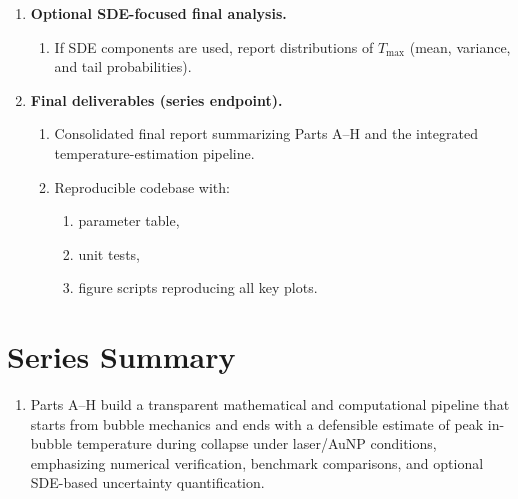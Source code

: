 \documentclass[11pt]{article}
\begin{document}
\begin{enumerate}
		\item \textbf{Optional SDE-focused final analysis.}
		\begin{enumerate}
			\item If SDE components are used, report distributions of $T_{\max}$ (mean, variance, and tail probabilities).
		\end{enumerate}
		
		\item \textbf{Final deliverables (series endpoint).}
		\begin{enumerate}
			\item Consolidated final report summarizing Parts A--H and the integrated temperature-estimation pipeline.
			\item Reproducible codebase with:
			\begin{enumerate}
				\item parameter table,
				\item unit tests,
				\item figure scripts reproducing all key plots.
			\end{enumerate}
		\end{enumerate}
	\end{enumerate}
	
	\newpage
	
	\section*{Series Summary}
	\begin{enumerate}
		\item Parts A--H build a transparent mathematical and computational pipeline that starts from bubble mechanics and ends with a defensible estimate of peak in-bubble temperature during collapse under laser/AuNP conditions, emphasizing numerical verification, benchmark comparisons, and optional SDE-based uncertainty quantification.
	\end{enumerate}
	
\end{document}
